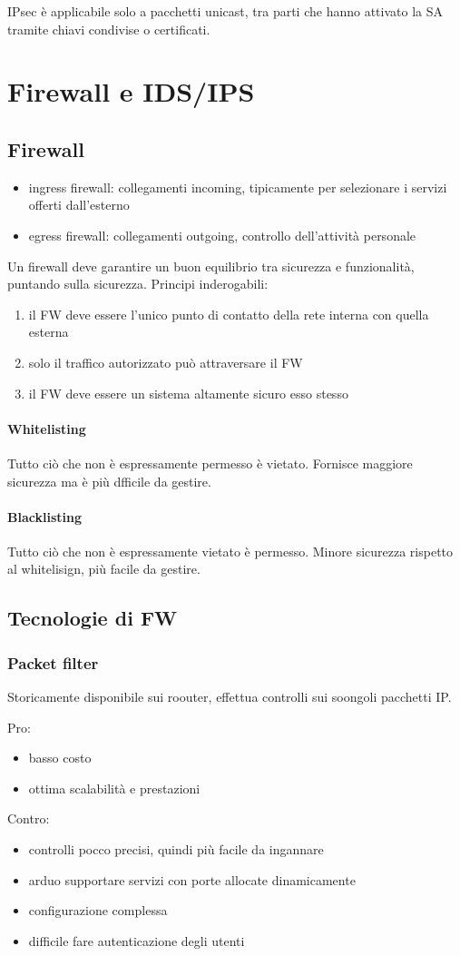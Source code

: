 \documentclass[11pt]{article}
\begin{document}
IPsec è applicabile solo a pacchetti unicast, tra parti che hanno attivato la SA tramite chiavi condivise o certificati.
\section{Firewall e IDS/IPS}
\subsection{Firewall}
\begin{itemize}
    \item ingress firewall: collegamenti incoming, tipicamente per selezionare i servizi offerti dall'esterno
    \item egress firewall: collegamenti outgoing, controllo dell'attività personale
\end{itemize}
Un firewall deve garantire un buon equilibrio tra sicurezza e funzionalità, puntando sulla sicurezza.
Principi inderogabili:
\begin{enumerate}
    \item il FW deve essere l'unico punto di contatto della rete interna con quella esterna 
    \item solo il traffico autorizzato può attraversare il FW 
    \item il FW deve essere un sistema altamente sicuro esso stesso
\end{enumerate}
\paragraph*{Whitelisting}
Tutto ciò che non è espressamente permesso è vietato. Fornisce maggiore sicurezza ma è più dfficile da gestire.
\paragraph*{Blacklisting}
Tutto ciò che non è espressamente vietato è permesso. Minore sicurezza rispetto al whitelisign, più facile da gestire.
\subsection{Tecnologie di FW}
\subsubsection{Packet filter}
Storicamente disponibile sui roouter, effettua controlli sui soongoli pacchetti IP.

Pro:
\begin{itemize}
    \item basso costo 
    \item ottima scalabilità e prestazioni 
\end{itemize} 
Contro:
\begin{itemize}
    \item controlli pocco precisi, quindi più facile da ingannare 
    \item arduo supportare servizi con porte allocate dinamicamente 
    \item configurazione complessa 
    \item difficile fare autenticazione degli utenti 
\end{itemize}
\end{document}
